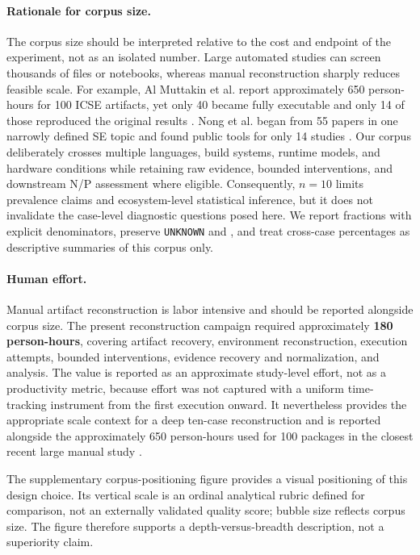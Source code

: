 \documentclass[a4paper,fleqn]{cas-dc}
\begin{document}
\paragraph{Rationale for corpus size.}
The corpus size should be interpreted relative to the cost and endpoint of the experiment, not as an isolated number. Large automated studies can screen thousands of files or notebooks, whereas manual reconstruction sharply reduces feasible scale. For example, Al Muttakin et al. report approximately 650 person-hours for 100 ICSE artifacts, yet only 40 became fully executable and only 14 of those reproduced the original results \citep{muttakin2026openscience}. Nong et al. began from 55 papers in one narrowly defined SE topic and found public tools for only 14 studies \citep{nong2023openscience}. Our corpus deliberately crosses multiple languages, build systems, runtime models, and hardware conditions while retaining raw evidence, bounded interventions, and downstream N/P assessment where eligible. Consequently, $n=10$ limits prevalence claims and ecosystem-level statistical inference, but it does not invalidate the case-level diagnostic questions posed here. We report fractions with explicit denominators, preserve \texttt{UNKNOWN} and \protect{}, and treat cross-case percentages as descriptive summaries of this corpus only.

\paragraph{Human effort.}
Manual artifact reconstruction is labor intensive and should be reported alongside corpus size. The present reconstruction campaign required approximately \textbf{180 person-hours}, covering artifact recovery, environment reconstruction, execution attempts, bounded interventions, evidence recovery and normalization, and analysis. The value is reported as an approximate study-level effort, not as a productivity metric, because effort was not captured with a uniform time-tracking instrument from the first execution onward. It nevertheless provides the appropriate scale context for a deep ten-case reconstruction and is reported alongside the approximately 650 person-hours used for 100 packages in the closest recent large manual study \citep{muttakin2026openscience}.

The supplementary corpus-positioning figure provides a visual positioning of this design choice. Its vertical scale is an ordinal analytical rubric defined for comparison, not an externally validated quality score; bubble size reflects corpus size. The figure therefore supports a depth-versus-breadth description, not a superiority claim.
\end{document}
